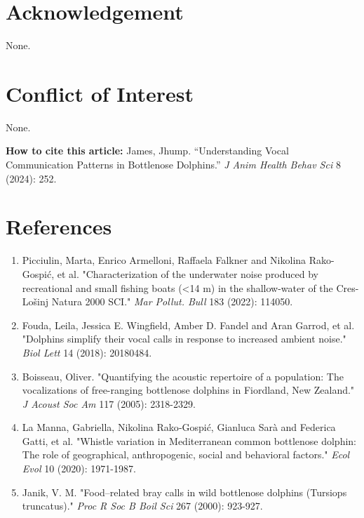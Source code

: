 \documentclass{article}
\begin{document}
\begin{multicols}{2}
\section*{\color{color_100238}Acknowledgement}
None.
\section*{\color{color_100238}Conflict of Interest}
None.

\begin{framed}
\noindent\fontsize{8.5}{10.2}\selectfont
\textbf{How to cite this article:} James, Jhump. “Understanding Vocal Communication Patterns in Bottlenose Dolphins.” \textit{J Anim Health Behav Sci} 8 (2024): 252.
\end{framed}

\section*{\color{color_100238}References}
\fontsize{8}{9.6}\selectfont
\begin{enumerate}
    \item Picciulin, Marta, Enrico Armelloni, Raffaela Falkner and Nikolina Rako-Gospić, et al. "Characterization of the underwater noise produced by recreational and small fishing boats (<14 m) in the shallow-water of the Cres-Lošinj Natura 2000 SCI." \textit{Mar Pollut. Bull} 183 (2022): 114050.
    \item Fouda, Leila, Jessica E. Wingfield, Amber D. Fandel and Aran Garrod, et al. "Dolphins simplify their vocal calls in response to increased ambient noise." \textit{Biol Lett} 14 (2018): 20180484.
    \item Boisseau, Oliver. "Quantifying the acoustic repertoire of a population: The vocalizations of free-ranging bottlenose dolphins in Fiordland, New Zealand." \textit{J Acoust Soc Am} 117 (2005): 2318-2329.
    \item La Manna, Gabriella, Nikolina Rako‐Gospić, Gianluca Sarà and Federica Gatti, et al. "Whistle variation in Mediterranean common bottlenose dolphin: The role of geographical, anthropogenic, social and behavioral factors." \textit{Ecol Evol} 10 (2020): 1971-1987.
    \item Janik, V. M. "Food–related bray calls in wild bottlenose dolphins (Tursiops truncatus)." \textit{Proc R Soc B Boil Sci} 267 (2000): 923-927.
\end{enumerate}
\end{multicols}
\end{document}
